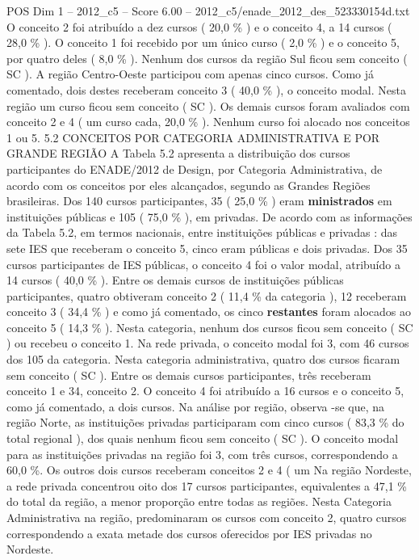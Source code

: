 \begin{textsample}{POS Dim 1 – 2012\_c5 – Score 6.00 – 2012\_c5/enade\_2012\_des\_523330154d.txt}
O conceito 2 foi atribuído a dez cursos ( 20,0 \% ) e o conceito 4, a 14 cursos ( 28,0 \% ).
O conceito 1 foi recebido por um único curso ( 2,0 \% ) e o conceito 5, por quatro deles ( 8,0 \% ).
Nenhum dos cursos da região Sul ficou sem conceito ( SC ).
A região Centro-Oeste participou com apenas cinco cursos.
Como já comentado, dois destes receberam conceito 3 ( 40,0 \% ), o conceito modal.
Nesta região um curso ficou sem conceito ( SC ).
Os demais cursos foram avaliados com conceito 2 e 4 ( um curso cada, 20,0 \% ).
Nenhum curso foi alocado nos conceitos 1 ou 5. 5.2 CONCEITOS POR CATEGORIA ADMINISTRATIVA E POR GRANDE REGIÃO A Tabela 5.2 apresenta a distribuição dos cursos participantes do ENADE/2012 de Design, por Categoria Administrativa, de acordo com os conceitos por eles alcançados, segundo as Grandes Regiões brasileiras.
Dos 140 cursos participantes, 35 ( 25,0 \% ) eram \textbf{ministrados} em instituições públicas e 105 ( 75,0 \% ), em privadas.
De acordo com as informações da Tabela 5.2, em termos nacionais, entre instituições públicas e privadas : das sete IES que receberam o conceito 5, cinco eram públicas e dois privadas.
Dos 35 cursos participantes de IES públicas, o conceito 4 foi o valor modal, atribuído a 14 cursos ( 40,0 \% ).
Entre os demais cursos de instituições públicas participantes, quatro obtiveram conceito 2 ( 11,4 \% da categoria ), 12 receberam conceito 3 ( 34,4 \% ) e como já comentado, os cinco \textbf{restantes} foram alocados ao conceito 5 ( 14,3 \% ).
Nesta categoria, nenhum dos cursos ficou sem conceito ( SC ) ou recebeu o conceito 1.
Na rede privada, o conceito modal foi 3, com 46 cursos dos 105 da categoria.
Nesta categoria administrativa, quatro dos cursos ficaram sem conceito ( SC ).
Entre os demais cursos participantes, três receberam conceito 1 e 34, conceito 2.
O conceito 4 foi atribuído a 16 cursos e o conceito 5, como já comentado, a dois cursos.
Na análise por região, observa -se que, na região Norte, as instituições privadas participaram com cinco cursos ( 83,3 \% do total regional ), dos quais nenhum ficou sem conceito ( SC ).
O conceito modal para as instituições privadas na região foi 3, com três cursos, correspondendo a 60,0 \%.
Os outros dois cursos receberam conceitos 2 e 4 ( um Na região Nordeste, a rede privada concentrou oito dos 17 cursos participantes, equivalentes a 47,1 \% do total da região, a menor proporção entre todas as regiões.
Nesta Categoria Administrativa na região, predominaram os cursos com conceito 2, quatro cursos correspondendo a exata metade dos cursos oferecidos por IES privadas no Nordeste.

\end{textsample}
